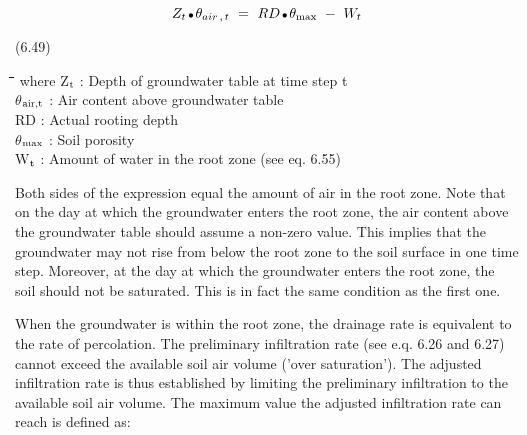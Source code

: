\documentclass[11pt]{article}
\begin{document}
\begin{displaymath}
Z _{t} \, {\rm \Bullet{0.75ex}}\, \theta _{air\, ,\, t} ~=~ RD\, {\rm \Bullet{0.75ex}}\, \theta _{\max } ~-~ W _{t} 
\end{displaymath}

 \bigskip
\strut\hfill (6.49)
\nwln
\begin{tabbing}
\hspace{1.27cm}\=\hspace{1.27cm}\=\hspace{1.27cm}\=\hspace{1.27cm}\=%
\hspace{1.27cm}\=\hspace{1.27cm}\=\hspace{1.27cm}\=\hspace{1.27cm}\=%
\hspace{1.27cm}\=\hspace{1.27cm}\=\kill
where\> Z$_{{\rm t}}$\> : Depth of groundwater table at time step t\> \> \> \> \> \> \> \> [cm]\\
\>$\theta$$_{{\rm air,t}}$\> : Air content above groundwater table\> \> \> \> \> \> \> \> [cm$^{{\rm 3}}$ cm$^{{\rm -3}}$]\\
\>RD\> : Actual rooting depth\> \> \> \> \> \> \> \> [cm]\\
\>$\theta$$_{{\rm max}}$\> : Soil porosity\> \> \> \> \> \> \> \> [cm$^{{\rm 3}}$ cm$^{{\rm -3}}$]\\
\>W$_{{\rm t}}$\> : Amount of water in the root zone (see eq. 6.55)\> \> \> \> \> \> \> \> [cm]
\end{tabbing}

\bigskip
\bigskip
Both sides of the expression equal the amount of air in the root zone. Note that on the
day at which the groundwater enters the root zone, the air content above the groundwater
table should assume a non-zero value. This implies that the groundwater may not rise
from below the root zone to the soil surface in one time step. Moreover, at the day at
which the groundwater enters the root zone, the soil should not be saturated. This is in
fact the same condition as the first one. 

\bigskip
\bigskip
When the groundwater is within the root zone, the drainage rate is equivalent to the rate
of percolation. The preliminary infiltration rate (see e.q. 6.26 and 6.27) cannot exceed
the available soil air volume ('over saturation'). The adjusted infiltration rate is thus
established by limiting the preliminary infiltration to the available soil air volume. The
maximum value the adjusted infiltration rate can reach is defined as:
\end{document}
